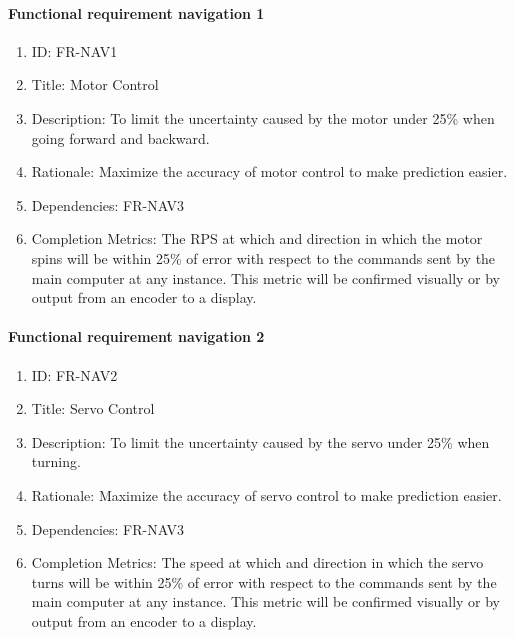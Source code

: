 \documentclass[compsoc,draftclsnofoot,onecolumn,10pt]{IEEEtran}
\begin{document}
	\paragraph{Functional requirement navigation 1}
		\begin{enumerate}
			\item ID: FR-NAV1
			\item Title: Motor Control
			\item Description: To limit the uncertainty caused by the motor under 25\% when going forward and backward.
			\item Rationale: Maximize the accuracy of motor control to make prediction easier.
			\item Dependencies: FR-NAV3
			\item Completion Metrics: The RPS at which and direction in which the motor spins will be within 25\% of error with respect to the commands sent by the main computer at any instance. 
			This metric will be confirmed visually or by output from an encoder to a display.
		\end{enumerate}

	\paragraph{Functional requirement navigation 2}
		\begin{enumerate}
			\item ID: FR-NAV2
			\item Title: Servo Control
			\item Description: To limit the uncertainty caused by the servo under 25\% when turning.
			\item Rationale: Maximize the accuracy of servo control to make prediction easier.
			\item Dependencies: FR-NAV3
			\item Completion Metrics: The speed at which and direction in which the servo turns will be within 25\% of error with respect to the commands sent by the main computer at any instance. 
			This metric will be confirmed visually or by output from an encoder to a display.
		\end{enumerate}
\end{document}
